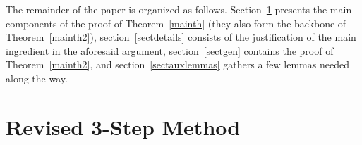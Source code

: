 \documentclass{article}
\numberwithin{equation}{section}
\begin{document}
The remainder of the paper is organized as follows. Section~\ref{sectplan} presents the main components of the proof of Theorem~\ref{mainth} (they also form the backbone of Theorem~\ref{mainth2}), section~\ref{sectdetails} consists of the justification of the main ingredient in the aforesaid argument, section~\ref{sectgen} contains the proof of Theorem~\ref{mainth2}, and section~\ref{sectauxlemmas} gathers a few lemmas needed along the way.



\section{Revised 3-Step Method}\label{sectplan}
\end{document}
